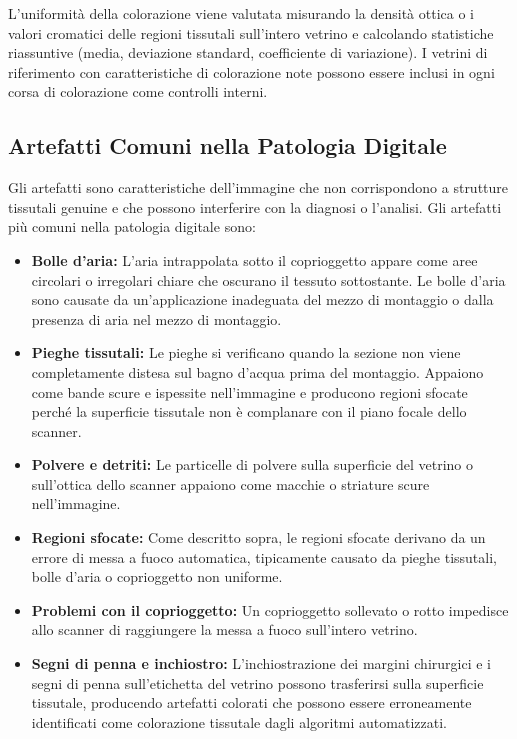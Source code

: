 L'uniformità della colorazione viene valutata misurando la densità ottica o i valori cromatici
delle regioni tissutali sull'intero vetrino e calcolando statistiche riassuntive (media,
deviazione standard, coefficiente di variazione). I vetrini di riferimento con caratteristiche di
colorazione note possono essere inclusi in ogni corsa di colorazione come controlli interni.

\subsection{Artefatti Comuni nella Patologia Digitale}

Gli artefatti sono caratteristiche dell'immagine che non corrispondono a strutture tissutali
genuine e che possono interferire con la diagnosi o l'analisi. Gli artefatti più comuni nella
patologia digitale sono:

\begin{itemize}
    \item \textbf{Bolle d'aria:} L'aria intrappolata sotto il coprioggetto appare come aree
    circolari o irregolari chiare che oscurano il tessuto sottostante. Le bolle d'aria sono
    causate da un'applicazione inadeguata del mezzo di montaggio o dalla presenza di aria nel
    mezzo di montaggio.

    \item \textbf{Pieghe tissutali:} Le pieghe si verificano quando la sezione non viene
    completamente distesa sul bagno d'acqua prima del montaggio. Appaiono come bande scure e
    ispessite nell'immagine e producono regioni sfocate perché la superficie tissutale non è
    complanare con il piano focale dello scanner.

    \item \textbf{Polvere e detriti:} Le particelle di polvere sulla superficie del vetrino o
    sull'ottica dello scanner appaiono come macchie o striature scure nell'immagine.

    \item \textbf{Regioni sfocate:} Come descritto sopra, le regioni sfocate derivano da un
    errore di messa a fuoco automatica, tipicamente causato da pieghe tissutali, bolle d'aria o
    coprioggetto non uniforme.

    \item \textbf{Problemi con il coprioggetto:} Un coprioggetto sollevato o rotto impedisce allo
    scanner di raggiungere la messa a fuoco sull'intero vetrino.

    \item \textbf{Segni di penna e inchiostro:} L'inchiostrazione dei margini chirurgici e i
    segni di penna sull'etichetta del vetrino possono trasferirsi sulla superficie tissutale,
    producendo artefatti colorati che possono essere erroneamente identificati come colorazione
    tissutale dagli algoritmi automatizzati.
\end{itemize}

